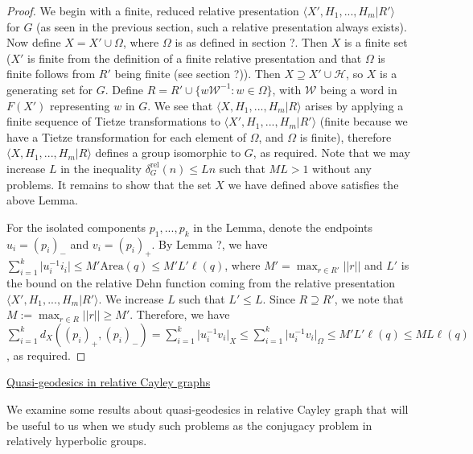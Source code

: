 \documentclass[12pt]{article}
\newcommand{\vs}{\vskip10pt}
\begin{document}
	\begin{proof}
		
		We begin with a finite, reduced relative presentation $\langle X', H_1,...,H_m \vert R' \rangle$ for $G$ (as seen in the previous section, such a relative presentation always exists). Now define $X = X' \cup \Omega$, where $\Omega$ is as defined in section ?. Then $X$ is a finite set ($X'$ is finite from the definition of a finite relative presentation and that $\Omega$ is finite follows from $R'$ being finite (see section ?)). Then $X \supseteq X' \cup \mathcal{H}$, so $X$ is a generating set for $G$. Define $R = R' \cup \{w \mathcal{W}^{-1}: w \in \Omega\}$, with $\mathcal{W}$ being a word in $F(X')$ representing $w$ in $G$. We see that $\langle X, H_1,...,H_m \vert R \rangle$ arises by applying a finite sequence of Tietze transformations to $\langle X', H_1,...,H_m \vert R' \rangle$ (finite because we have a Tietze transformation for each element of $\Omega$, and $\Omega$ is finite), therefore $\langle X, H_1,...,H_m \vert R \rangle$ defines a group isomorphic to $G$, as required. Note that we may increase $L$ in the inequality $\delta^{\text{rel}}_G(n) \leq Ln$ such that $ML > 1$ without any problems. It remains to show that the set $X$ we have defined above satisfies the above Lemma. 
		
		\vs 
		
		For the isolated components $p_1,...,p_k$ in the Lemma, denote the endpoints $u_i = (p_i)_-$ and $v_i = (p_i)_+$. By Lemma ?, we have $\sum_{i = 1}^k \vert u_i^{-1} i_i \vert \leq M' \text{Area}(q) \leq M' L' \ell(q)$, where $M' = \max_{r \in R'} \vert \vert r \vert \vert$ and $L'$ is the bound on the relative Dehn function coming from the relative presentation $\langle X', H_1,...,H_m \vert R' \rangle$. We increase $L$ such that $L' \leq L$. Since $R \supseteq R'$, we note that $M:= \max_{r \in R} \vert \vert r \vert \vert \geq M'$. Therefore, we have $\sum_{i=1}^k d_X((p_i)_+, (p_i)_-) = \sum_{i=1}^k \vert u_i^{-1} v_i \vert_X \leq \sum_{i=1}^k \vert u_i^{-1}v_i \vert_{\Omega} \leq M' L' \ell(q) \leq ML \ell(q)$, as required. 
		
	\end{proof}
	
	\vs
	
	\underline{Quasi-geodesics in relative Cayley graphs}
	
	\vs
	
	We examine some results about quasi-geodesics in relative Cayley graph that will be useful to us when we study such problems as the conjugacy problem in relatively hyperbolic groups. 
	
\end{document}
